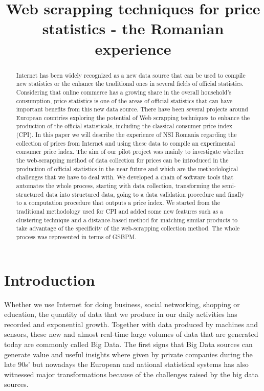 \documentclass[]{article}
\title{Web scrapping techniques for price statistics -  the Romanian experience}
\author{}
\begin{document}
\maketitle

\begin{abstract}
Internet has been widely recognized as a new data source that can be used to compile new statistics or the enhance the 
traditional ones in several fields of official statistics. Considering that online commerce has a growing share in the 
overall household’s consumption, price statistics is one of the areas of official statistics that can have important 
benefits from this new data source. There have been several projects around European countries exploring the potential 
of Web scrapping techniques to enhance the production of the official statisticals, including the classical consumer price index (CPI). 
In this paper we will describe the experience of NSI Romania regarding the collection of prices from Internet and 
using these data to compile an experimental consumer price index. The aim of our pilot project was mainly to investigate whether 
the web-scrapping method of data collection for prices can be introduced in the production of official statistics in the near future 
and which are the methodological challenges that we have to deal with.  
We developed a chain of software tools that automates the whole process, starting with data collection, transforming the semi-structured 
data into structured data, going to a data validation procedure and finally to a computation procedure that outputs a price index. 
We started from the traditional methodology used for CPI and added some new features such as a clustering technique and a 
distance-based method for matching similar products to take advantage of the specificity of the web-scrapping collection method. 
The whole process was represented in terms of GSBPM.
\end{abstract}

\section{Introduction}

Whether we use Internet for doing business, social networking, shopping or education, the quantity of data that 
we produce in our daily activities has recorded and exponential growth. Together with data produced by machines and sensors, these new and 
almost real-time large volumes of data that are generated today are commonly called Big Data. The first signs that Big Data sources 
can generate value and useful insights where given by private companies during the late 90s' but nowadays the European and national 
statistical systems has also witnessed major transformations because of the challenges raised by the big data sources. 
\end{document}
